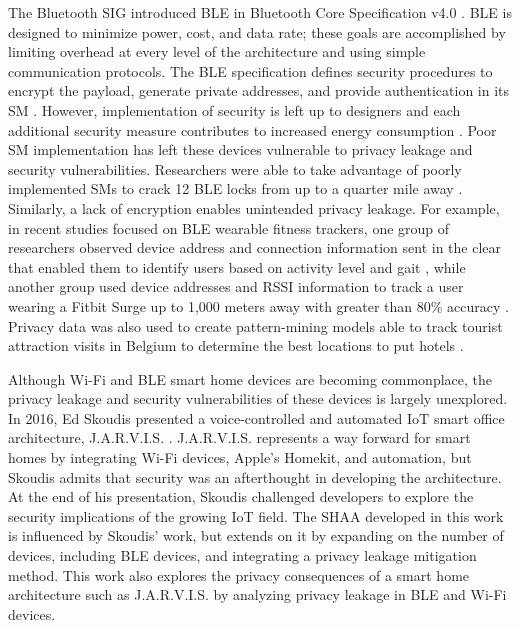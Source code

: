 \documentclass[journal]{./IEEEtran/IEEEtran}
\begin{document}
The Bluetooth \ac{SIG} introduced \ac{BLE} in Bluetooth Core Specification v4.0 \cite{sig4.0}. \ac{BLE} is designed to minimize power, cost, and data rate; these goals are accomplished by limiting overhead at every level of the architecture and using simple communication protocols. The \ac{BLE} specification defines security procedures to encrypt the payload, generate private addresses, and provide authentication in its \ac{SM} \cite{sig4.2}. However, implementation of security is left up to designers and each additional security measure contributes to increased energy consumption \cite{rHeydon}. Poor \ac{SM} implementation has left these devices vulnerable to privacy leakage and security vulnerabilities. Researchers were able to take advantage of poorly implemented \ac{SM}s to crack 12 \ac{BLE} locks from up to a quarter mile away \cite{RoseLocks}.	Similarly, a lack of encryption enables unintended privacy leakage. For example, in recent studies focused on \ac{BLE} wearable fitness trackers, one group of researchers observed device address and connection information sent in the clear that enabled them to identify users based on activity level and gait \cite{Das}, while another group used device addresses and \ac{RSSI} information to track a user wearing a Fitbit Surge up to 1,000 meters away with greater than 80\% accuracy \cite{RoseTrack}. Privacy data was also used to create pattern-mining models able to track tourist attraction visits in Belgium to determine the best locations to put hotels \cite{Versichele}. 
\figTrng

Although Wi-Fi and \ac{BLE} smart home devices are becoming commonplace, the privacy leakage and security vulnerabilities of these devices is largely unexplored. In 2016, Ed Skoudis presented a voice-controlled and automated \ac{IoT} smart office architecture, J.A.R.V.I.S. \cite{Skoudis}. J.A.R.V.I.S. represents a way forward for smart homes by integrating Wi-Fi devices, Apple's Homekit, and automation, but Skoudis admits that security was an afterthought in developing the architecture. At the end of his presentation, Skoudis challenged developers to explore the security implications of the growing \ac{IoT} field. The \ac{SHAA} developed in this work is influenced by Skoudis' work, but extends on it by expanding on the number of devices, including \ac{BLE} devices, and integrating a privacy leakage mitigation method. This work also explores the privacy consequences of a smart home architecture such as J.A.R.V.I.S. by analyzing privacy leakage in \ac{BLE} and Wi-Fi devices.
\end{document}
